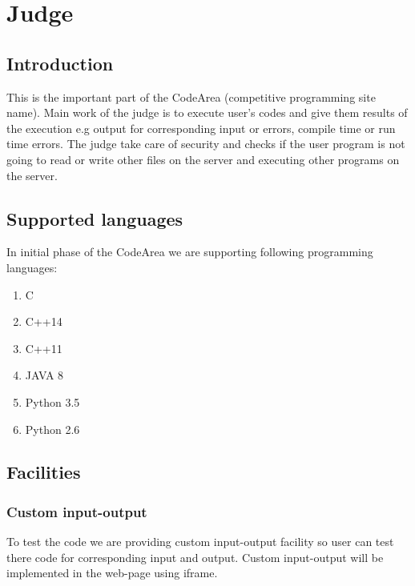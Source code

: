 \section{Judge}

\subsection{Introduction}
This is the important part of the CodeArea (competitive programming site name).
Main work of the judge is to execute user's codes and give them results of the execution e.g output for corresponding input or errors, compile time or run time errors. The judge take care of security and checks if the user program is not going to read or write other files on the server and executing other programs on the server.


\subsection{Supported languages}
In initial phase of the CodeArea we are supporting following programming languages:
\begin{enumerate}
    \item C
    \item C++14
    \item C++11
    \item JAVA 8
    \item Python 3.5
    \item Python 2.6
\end{enumerate}

\subsection{Facilities}
\vspace{0.3cm}
\subsubsection{Custom input-output}
To test the code we are providing custom input-output facility so user can test there code for corresponding input and output. Custom input-output will be implemented in the web-page using iframe.
\newpage
